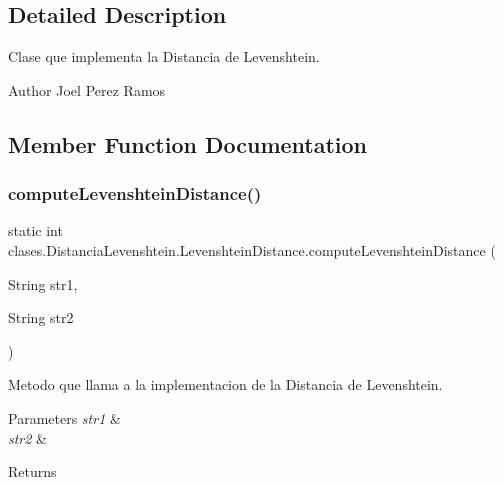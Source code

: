 \subsection{Detailed Description}
Clase que implementa la Distancia de Levenshtein. 

\begin{DoxyAuthor}{Author}
Joel Perez Ramos 
\end{DoxyAuthor}


\subsection{Member Function Documentation}
\hypertarget{classclases_1_1_distancia_levenshtein_1_1_levenshtein_distance_a32fafec4e825f1e645f3edb717515098}{}\label{classclases_1_1_distancia_levenshtein_1_1_levenshtein_distance_a32fafec4e825f1e645f3edb717515098} 
\subsubsection{\texorpdfstring{compute\+Levenshtein\+Distance()}{computeLevenshteinDistance()}\hspace{0.1cm}{\footnotesize\ttfamily [1/2]}}
{\footnotesize\ttfamily static int clases.\+Distancia\+Levenshtein.\+Levenshtein\+Distance.\+compute\+Levenshtein\+Distance (\begin{DoxyParamCaption}\item[{String}]{str1,  }\item[{String}]{str2 }\end{DoxyParamCaption})\hspace{0.3cm}{\ttfamily [static]}}



Metodo que llama a la implementacion de la Distancia de Levenshtein. 


\begin{DoxyParams}{Parameters}
{\em str1} & \\
\hline
{\em str2} & \\
\hline
\end{DoxyParams}
\begin{DoxyReturn}{Returns}

\end{DoxyReturn}
\hypertarget{classclases_1_1_distancia_levenshtein_1_1_levenshtein_distance_a5391113c57cf7ac23d8d7ab745a7e979}{}\label{classclases_1_1_distancia_levenshtein_1_1_levenshtein_distance_a5391113c57cf7ac23d8d7ab745a7e979} 
